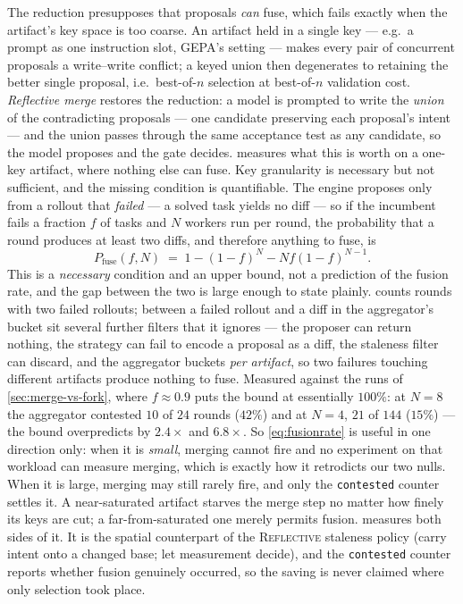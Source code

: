 \documentclass{article}
\newcommand{\code}[1]{\texttt{#1}}
\begin{document}
The reduction presupposes that proposals \emph{can} fuse, which fails exactly when the artifact's key space is too coarse. An artifact held in a single key --- e.g.\ a prompt as one instruction slot, GEPA's setting \citep{agrawal2025gepa} --- makes every pair of concurrent proposals a write--write conflict; a keyed union then degenerates to retaining the better single proposal, i.e.\ best-of-$n$ selection at best-of-$n$ validation cost. \emph{Reflective merge} restores the reduction: a model is prompted to write the \emph{union} of the contradicting proposals --- one candidate preserving each proposal's intent --- and the union passes through the same acceptance test as any candidate, so the model proposes and the gate decides.  measures what this is worth on a one-key artifact, where nothing else can fuse. Key granularity is necessary but not sufficient, and the missing condition is quantifiable. The engine proposes only from a rollout that \emph{failed} --- a solved task yields no diff --- so if the incumbent fails a fraction $f$ of tasks and $N$ workers run per round, the probability that a round produces at least two diffs, and therefore anything to fuse, is
\begin{equation}
\label{eq:fusionrate}
P_{\text{fuse}}(f, N) \;=\; 1 - (1-f)^N - N f (1-f)^{N-1}.
\end{equation}
This is a \emph{necessary} condition and an upper bound, not a prediction of the fusion rate, and the gap between the two is large enough to state plainly.  counts rounds with two failed rollouts; between a failed rollout and a diff in the aggregator's bucket sit several further filters that it ignores --- the proposer can return nothing, the strategy can fail to encode a proposal as a diff, the staleness filter can discard, and the aggregator buckets \emph{per artifact}, so two failures touching different artifacts produce nothing to fuse. Measured against the runs of \cref{sec:merge-vs-fork}, where $f \approx 0.9$ puts the bound at essentially $100\%$: at $N{=}8$ the aggregator contested $10$ of $24$ rounds ($42\%$) and at $N{=}4$, $21$ of $144$ ($15\%$) --- the bound overpredicts by $2.4\times$ and $6.8\times$. So \cref{eq:fusionrate} is useful in one direction only: when it is \emph{small}, merging cannot fire and no experiment on that workload can measure merging, which is exactly how it retrodicts our two nulls. When it is large, merging may still rarely fire, and only the \code{contested} counter settles it. A near-saturated artifact starves the merge step no matter how finely its keys are cut; a far-from-saturated one merely permits fusion.  measures both sides of it. It is the spatial counterpart of the \textsc{Reflective} staleness policy (carry intent onto a changed base; let measurement decide), and the \code{contested} counter reports whether fusion genuinely occurred, so the saving is never claimed where only selection took place.
\end{document}
